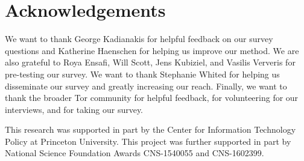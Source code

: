 \section*{Acknowledgements}
We want to thank George Kadianakis for helpful feedback on our survey questions
and Katherine Haenschen for helping us improve our method.  We are also grateful
to Roya Ensafi, Will Scott, Jens Kubiziel, and Vasilis Ververis for pre-testing
our survey.  We want to thank Stephanie Whited for helping us disseminate our
survey and greatly increasing our reach.  Finally, we want to thank the broader
Tor community for helpful feedback, for volunteering for our interviews, and for
taking our survey.

This research was supported in part by the Center for Information Technology
Policy at Princeton University.  This project was further supported in part by
National Science Foundation Awards CNS-1540055 and CNS-1602399.
